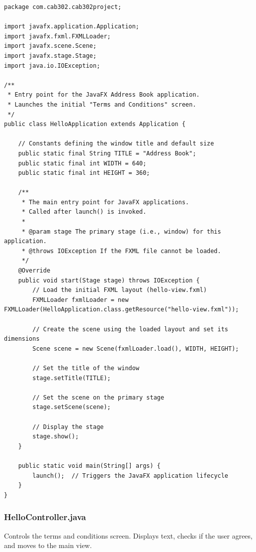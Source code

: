 \documentclass{article}
\begin{document}
\begin{verbatim}
package com.cab302.cab302project;

import javafx.application.Application;
import javafx.fxml.FXMLLoader;
import javafx.scene.Scene;
import javafx.stage.Stage;
import java.io.IOException;

/**
 * Entry point for the JavaFX Address Book application.
 * Launches the initial "Terms and Conditions" screen.
 */
public class HelloApplication extends Application {

    // Constants defining the window title and default size
    public static final String TITLE = "Address Book";
    public static final int WIDTH = 640;
    public static final int HEIGHT = 360;

    /**
     * The main entry point for JavaFX applications.
     * Called after launch() is invoked.
     *
     * @param stage The primary stage (i.e., window) for this application.
     * @throws IOException If the FXML file cannot be loaded.
     */
    @Override
    public void start(Stage stage) throws IOException {
        // Load the initial FXML layout (hello-view.fxml)
        FXMLLoader fxmlLoader = new FXMLLoader(HelloApplication.class.getResource("hello-view.fxml"));

        // Create the scene using the loaded layout and set its dimensions
        Scene scene = new Scene(fxmlLoader.load(), WIDTH, HEIGHT);

        // Set the title of the window
        stage.setTitle(TITLE);

        // Set the scene on the primary stage
        stage.setScene(scene);

        // Display the stage
        stage.show();
    }

    public static void main(String[] args) {
        launch();  // Triggers the JavaFX application lifecycle
    }
}
\end{verbatim}

\subsubsection*{HelloController.java}
Controls the terms and conditions screen. Displays text, checks if the user agrees, and moves to the main view.
\end{document}
